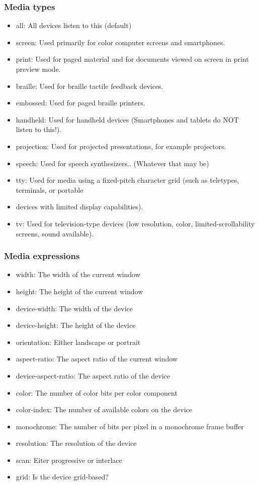 \documentclass{article}
\begin{document}
\subsubsection{Media types}
\begin{itemize}
    \item all: All devices listen to this (default)
    \item screen: Used primarily for color computer screens and smartphones.
    \item print: Used for paged material and for documents viewed on screen in print preview mode.
    \item braille: Used for braille tactile feedback devices.
    \item embossed: Used for paged braille printers.
    \item handheld: Used for handheld devices (Smartphones and tablets do NOT listen to this!).
    \item projection: Used for projected presentations, for example projectors.
    \item speech: Used for speech synthesizers.. (Whatever that may be)
    \item tty: Used for media using a fixed-pitch character grid (such as teletypes, terminals, or portable
    \item devices with limited display capabilities).
    \item tv: Used for television-type devices (low resolution, color, limited-scrollability screens, sound available).
\end{itemize}

\subsubsection{Media expressions}
\begin{itemize}
    \item width: The width of the current window
    \item height: The height of the current window
    \item device-width: The width of the device
    \item device-height: The height of the device
    \item orientation: Either landscape or portrait
    \item aspect-ratio: The aspect ratio of the current window
    \item device-aspect-ratio: The aspect ratio of the device
    \item color: The number of color bits per color component
    \item color-index: The number of available colors on the device
    \item monochrome: The number of bits per pixel in a monochrome frame buffer
    \item resolution: The resolution of the device
    \item scan: Eiter progressive or interlace
    \item grid: Is the device grid-based?
\end{itemize}
\end{document}
